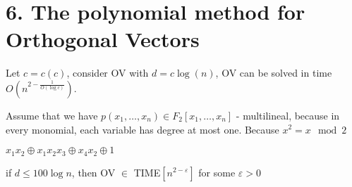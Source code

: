 
\section{6. The polynomial method for Orthogonal Vectors}

\begin{thm}
	Let $ c = c(c)$, consider OV with $d = c \log(n)$, OV can be solved in time $O(n^{2 - \frac{1}{O(\log c)}})$.
\end{thm}

\begin{remrk}
	Assume that we have $p(x_1, \dots, x_n) \in F_2[x_1, \dots, x_n]$ - multilineal, because in every monomial, each variable has degree at most one. Because $x^2 = x \mod 2$
\end{remrk}

\begin{exmpl}
	$x_1 x_2 \oplus x_1 x_2 x_3 \oplus x_4 x_2 \oplus 1$
\end{exmpl}


\begin{crly*}
	if $d \leq 100 \log n$, then OV $\in$ TIME$[n^{2-\varepsilon}]$ for some $\varepsilon > 0$
\end{crly*}

